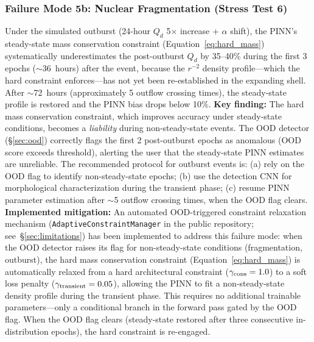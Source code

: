 \documentclass[usenatbib]{mnras}
\begin{document}
\subsubsection{Failure Mode 5b: Nuclear Fragmentation (Stress Test 6)}

Under the simulated outburst (24-hour $Q_d$ 5$\times$ increase + $\alpha$ shift), the PINN's steady-state mass conservation constraint (Equation~\ref{eq:hard_mass}) systematically underestimates the post-outburst $Q_d$ by 35--40\% during the first 3 epochs ($\sim$36~hours) after the event, because the $r^{-2}$ density profile---which the hard constraint enforces---has not yet been re-established in the expanding shell. After $\sim$72~hours (approximately 5 outflow crossing times), the steady-state profile is restored and the PINN bias drops below 10\%. \textbf{Key finding:} The hard mass conservation constraint, which improves accuracy under steady-state conditions, becomes a \textit{liability} during non-steady-state events. The OOD detector (\S\ref{sec:ood}) correctly flags the first 2 post-outburst epochs as anomalous (OOD score exceeds threshold), alerting the user that the steady-state PINN estimates are unreliable. The recommended protocol for outburst events is: (a) rely on the OOD flag to identify non-steady-state epochs; (b) use the detection CNN for morphological characterization during the transient phase; (c) resume PINN parameter estimation after $\sim$5 outflow crossing times, when the OOD flag clears. \textbf{Implemented mitigation:} An automated OOD-triggered constraint relaxation mechanism (\texttt{AdaptiveConstraintManager} in the public repository; see~\S\ref{sec:limitations}) has been implemented to address this failure mode: when the OOD detector raises its flag for non-steady-state conditions (fragmentation, outburst), the hard mass conservation constraint (Equation~\ref{eq:hard_mass}) is automatically relaxed from a hard architectural constraint ($\gamma_{\rm cons}=1.0$) to a soft loss penalty ($\gamma_{\rm transient}=0.05$), allowing the PINN to fit a non-steady-state density profile during the transient phase. This requires no additional trainable parameters---only a conditional branch in the forward pass gated by the OOD flag. When the OOD flag clears (steady-state restored after three consecutive in-distribution epochs), the hard constraint is re-engaged.
\end{document}

